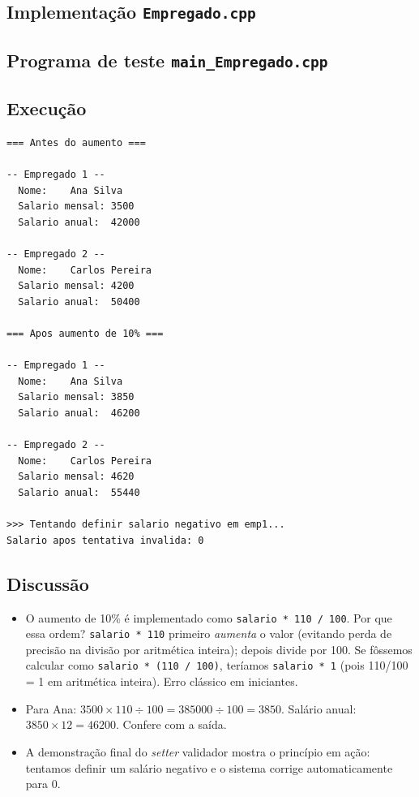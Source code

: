 \documentclass[11pt,a4paper]{article}
\begin{document}


\subsection*{Implementa\c{c}\~ao \texttt{Empregado.cpp}}



\subsection*{Programa de teste \texttt{main\_Empregado.cpp}}



\subsection*{Execu\c{c}\~ao}

\begin{saidabox}
\begin{lstlisting}[style=terminal]
=== Antes do aumento ===

-- Empregado 1 --
  Nome:    Ana Silva
  Salario mensal: 3500
  Salario anual:  42000

-- Empregado 2 --
  Nome:    Carlos Pereira
  Salario mensal: 4200
  Salario anual:  50400

=== Apos aumento de 10% ===

-- Empregado 1 --
  Nome:    Ana Silva
  Salario mensal: 3850
  Salario anual:  46200

-- Empregado 2 --
  Nome:    Carlos Pereira
  Salario mensal: 4620
  Salario anual:  55440

>>> Tentando definir salario negativo em emp1...
Salario apos tentativa invalida: 0
\end{lstlisting}
\end{saidabox}

\subsection*{Discuss\~ao}

\begin{itemize}[leftmargin=*]
  \item O aumento de 10\% \'e implementado como \texttt{salario * 110 / 100}. Por que essa ordem? \texttt{salario * 110} primeiro \emph{aumenta} o valor (evitando perda de precis\~ao na divis\~ao por aritm\'etica inteira); depois divide por 100. Se f\^ossemos calcular como \texttt{salario * (110 / 100)}, ter\'iamos \texttt{salario * 1} (pois 110/100 = 1 em aritm\'etica inteira). Erro cl\'assico em iniciantes.
  \item Para Ana: $3500 \times 110 \div 100 = 385000 \div 100 = 3850$. Sal\'ario anual: $3850 \times 12 = 46200$. Confere com a sa\'ida.
  \item A demonstra\c{c}\~ao final do \emph{setter} validador mostra o princ\'ipio em a\c{c}\~ao: tentamos definir um sal\'ario negativo e o sistema corrige automaticamente para 0.
\end{itemize}
\end{document}
